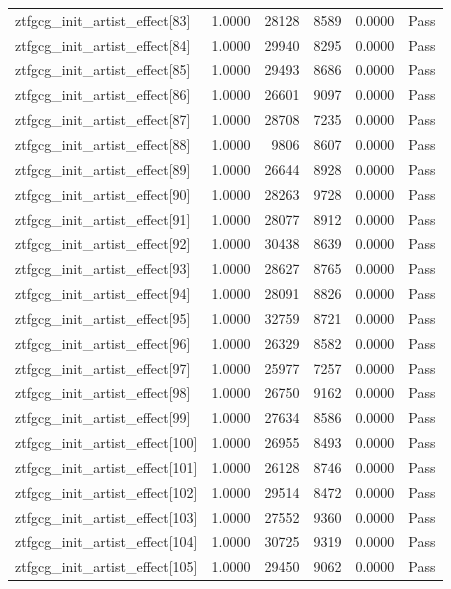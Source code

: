\begin{table}[htbp]
\begin{tabular}{llrrll}
ztfgcg\_init\_artist\_effect[83] & 1.0000 & 28128 & 8589 & 0.0000 & Pass \\
ztfgcg\_init\_artist\_effect[84] & 1.0000 & 29940 & 8295 & 0.0000 & Pass \\
ztfgcg\_init\_artist\_effect[85] & 1.0000 & 29493 & 8686 & 0.0000 & Pass \\
ztfgcg\_init\_artist\_effect[86] & 1.0000 & 26601 & 9097 & 0.0000 & Pass \\
ztfgcg\_init\_artist\_effect[87] & 1.0000 & 28708 & 7235 & 0.0000 & Pass \\
ztfgcg\_init\_artist\_effect[88] & 1.0000 & 9806 & 8607 & 0.0000 & Pass \\
ztfgcg\_init\_artist\_effect[89] & 1.0000 & 26644 & 8928 & 0.0000 & Pass \\
ztfgcg\_init\_artist\_effect[90] & 1.0000 & 28263 & 9728 & 0.0000 & Pass \\
ztfgcg\_init\_artist\_effect[91] & 1.0000 & 28077 & 8912 & 0.0000 & Pass \\
ztfgcg\_init\_artist\_effect[92] & 1.0000 & 30438 & 8639 & 0.0000 & Pass \\
ztfgcg\_init\_artist\_effect[93] & 1.0000 & 28627 & 8765 & 0.0000 & Pass \\
ztfgcg\_init\_artist\_effect[94] & 1.0000 & 28091 & 8826 & 0.0000 & Pass \\
ztfgcg\_init\_artist\_effect[95] & 1.0000 & 32759 & 8721 & 0.0000 & Pass \\
ztfgcg\_init\_artist\_effect[96] & 1.0000 & 26329 & 8582 & 0.0000 & Pass \\
ztfgcg\_init\_artist\_effect[97] & 1.0000 & 25977 & 7257 & 0.0000 & Pass \\
ztfgcg\_init\_artist\_effect[98] & 1.0000 & 26750 & 9162 & 0.0000 & Pass \\
ztfgcg\_init\_artist\_effect[99] & 1.0000 & 27634 & 8586 & 0.0000 & Pass \\
ztfgcg\_init\_artist\_effect[100] & 1.0000 & 26955 & 8493 & 0.0000 & Pass \\
ztfgcg\_init\_artist\_effect[101] & 1.0000 & 26128 & 8746 & 0.0000 & Pass \\
ztfgcg\_init\_artist\_effect[102] & 1.0000 & 29514 & 8472 & 0.0000 & Pass \\
ztfgcg\_init\_artist\_effect[103] & 1.0000 & 27552 & 9360 & 0.0000 & Pass \\
ztfgcg\_init\_artist\_effect[104] & 1.0000 & 30725 & 9319 & 0.0000 & Pass \\
ztfgcg\_init\_artist\_effect[105] & 1.0000 & 29450 & 9062 & 0.0000 & Pass \\

\end{tabular}
\end{table}
